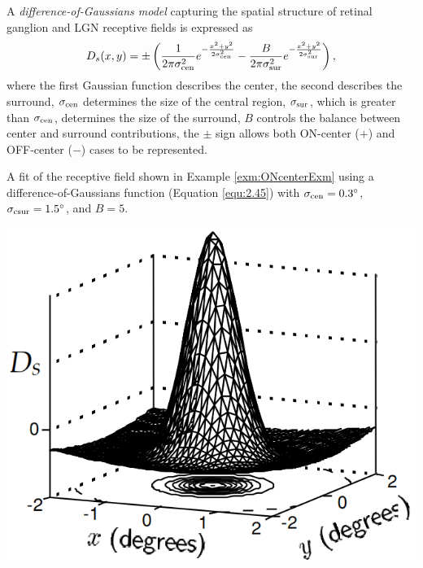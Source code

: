 \begin{defn}
  A \emph{difference-of-Gaussians model} capturing the spatial structure of retinal ganglion and LGN receptive fields is expressed as
  \begin{equation}
    \label{equ:2.45}
    D_s(x,y)=\pm\left(\frac{1}{2\pi\sigma_{\rm{cen}}^2}e^{-\frac{x^2+y^2}{2\sigma_{\rm{cen}}^2}}-\frac{B}{2\pi\sigma_{\rm{sur}}^2}e^{-\frac{x^2+y^2}{2\sigma_{\rm{sur}}^2}}\right),
  \end{equation}
  where the first Gaussian function describes the center, the second describes the surround, $\sigma_{\rm{cen}}$ determines the size of the central region, $\sigma_{\rm{sur}}$, which is greater than $\sigma_{\rm{cen}}$, determines the size of the surround, $B$ controls the balance between center and surround contributions, the $\pm$ sign allows both ON-center ($+$) and OFF-center ($-$) cases to be represented.
\end{defn}

\begin{exm}
  \label{exm:ONcenterEst}
  A fit of the receptive field shown in Example \ref{exm:ONcenterExm} using a difference-of-Gaussians function (Equation \ref{equ:2.45}) with $\sigma_{\rm{cen}} = 0.3^{\circ}$, $\sigma_{\rm{csur}} = 1.5^{\circ}$, and $B = 5$.
  \begin{center}
    \includegraphics[scale=0.25]{./png/ONcenterEst}
  \end{center}
\end{exm}


